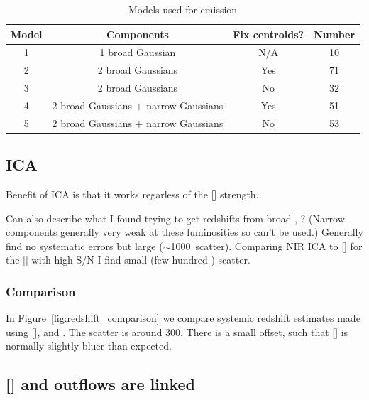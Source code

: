 \begin{table}
  \centering
  \small 
  \caption{Models used for \ha emission}
  \label{tab:hamod}
    \begin{tabular}{cccc} 
    \hline
    Model     & Components & Fix centroids? & Number \\
    \hline
    1        & 1 broad Gaussian  & N/A &  10 \\
    2        & 2 broad Gaussians & Yes &  71 \\
    3        & 2 broad Gaussians & No  &  32 \\
    4        & 2 broad Gaussians + narrow Gaussians & Yes & 51 \\
    5        & 2 broad Gaussians + narrow Gaussians & No  & 53 \\
    \hline
    \end{tabular}
\end{table} 

\subsection{\ac{ICA}}

Benefit of \ac{ICA} is that it works regarless of the [] strength. 

Can also describe what I found trying to get redshifts from broad \hans, \hbns? (Narrow components generally very weak at these luminosities so can't be used.)
Generally find no systematic errors but large ($\sim$1000\kms\, scatter).
Comparing NIR \ac{ICA} to [] for the [] with high \ac{S/N} I find small (few hundred \kms) scatter. 

\subsubsection{Comparison}

In Figure~\ref{fig:redshift_comparison} we compare systemic redshift estimates made using [], \hb and \ha. 
The scatter is around 300\kms. 
There is a small offset, such that [] is normally slightly bluer than expected. 



\subsection{[] and  outflows are linked}

